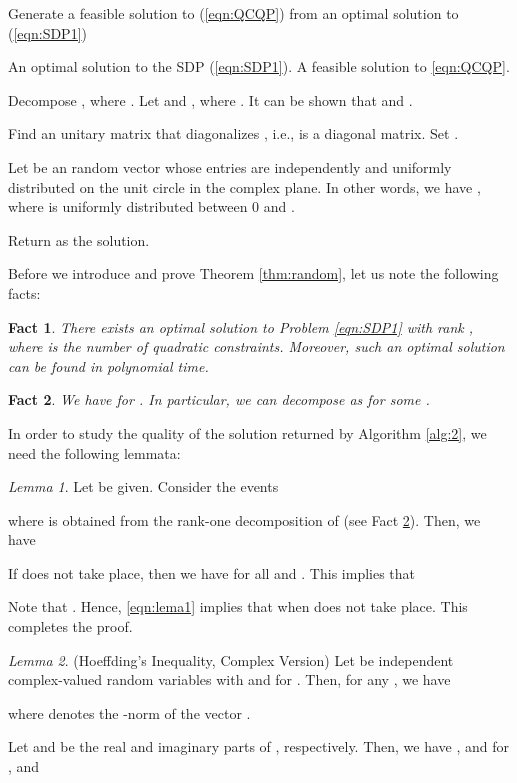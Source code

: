 \documentclass[twocolumn,10pt]{IEEEtran}
\theoremstyle{plain} \newtheorem{theorem}{Theorem}
\theoremstyle{plain} \newtheorem{proposition}{Proposition}
\theoremstyle{plain} \newtheorem{corollary}{Corollary}
\theoremstyle{remark} \newtheorem{remark}{Remark}
\theoremstyle{remark} \newtheorem{lemma}{Lemma}
\theoremstyle{plain} \newtheorem{definition}{Definition}
\theoremstyle{plain} \newtheorem{assumption}{Assumption}
\theoremstyle{plain} \newtheorem{fact}{Fact}
\begin{document}
\begin{algorithm}
\caption{Generate a feasible solution to (\ref{eqn:QCQP}) from an optimal solution  to (\ref{eqn:SDP1})}\label{alg:2}
\begin{algorithmic}[1]
\REQUIRE An optimal solution  to the SDP (\ref{eqn:SDP1}).
\ENSURE A feasible solution  to \eqref{eqn:QCQP}.

\STATE Decompose , where . Let  and , where .  It can be shown that  and .

\STATE Find an unitary matrix  that diagonalizes , i.e.,  is a diagonal matrix. Set .

\STATE Let  be an  random vector whose entries are independently and uniformly distributed on the unit circle in the complex plane. In other words, we have , where  is uniformly distributed between 0 and .

\STATE Return  as the solution.
\end{algorithmic}
\end{algorithm}



Before we introduce and prove Theorem \ref{thm:random}, let us note the following facts:
\begin{fact}\label{fact:rank}
\cite{HZ07} There exists an optimal solution to Problem \eqref{eqn:SDP1} with rank , where  is the number of quadratic constraints. Moreover, such an optimal solution can be found in polynomial time.
\end{fact}

\begin{fact}\label{fact:Qk}
We have  for .  In particular, we can decompose  as  for some .
\end{fact}
In order to study the quality of the solution returned by Algorithm \ref{alg:2}, we need the following lemmata:
\begin{lemma}\label{lem:A}
Let  be given.  Consider the events

where  is obtained from the rank-one decomposition of  (see Fact \ref{fact:Qk}). Then, we have

\end{lemma}
 If  does not take place, then we have  for all  and .  This implies that

Note that .  Hence, \eqref{eqn:lema1} implies that  when  does not take place.  This completes the proof. 
\begin{lemma} \label{lem:Hoeffding}
(Hoeffding's Inequality, Complex Version) Let  be independent complex-valued random variables with  and  for .  Then, for any , we have

where  denotes the -norm of the vector .
\end{lemma}
 Let  and  be the real and imaginary parts of , respectively.  Then, we have ,  and  for , and
\end{document}
